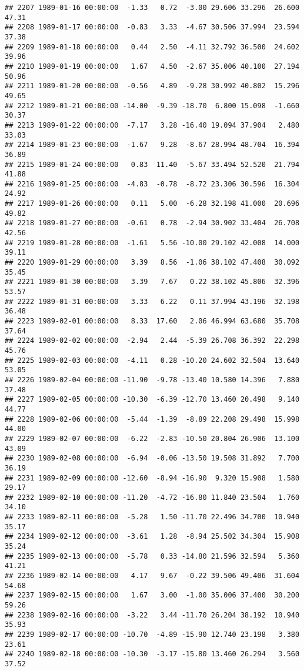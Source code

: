 \documentclass{article}\usepackage{graphicx, color}
\makeatletter
\newenvironment{kframe}{%
 \def\at@end@of@kframe{}%
 \ifinner\ifhmode%
  \def\at@end@of@kframe{\end{minipage}}%
  \begin{minipage}{\columnwidth}%
 \fi\fi%
 \def\FrameCommand##1{\hskip\@totalleftmargin \hskip-\fboxsep
 \colorbox{shadecolor}{##1}\hskip-\fboxsep
     \hskip-\linewidth \hskip-\@totalleftmargin \hskip\columnwidth}%
 \MakeFramed {\advance\hsize-\width
   \@totalleftmargin\z@ \linewidth\hsize
   \@setminipage}}%
 {\par\unskip\endMakeFramed%
 \at@end@of@kframe}
\newenvironment{knitrout}{}{} %
\makeatother
\begin{document}
\begin{knitrout}
\begin{kframe}
\begin{verbatim}
## 2207 1989-01-16 00:00:00  -1.33   0.72  -3.00 29.606 33.296  26.600  47.31
## 2208 1989-01-17 00:00:00  -0.83   3.33  -4.67 30.506 37.994  23.594  37.38
## 2209 1989-01-18 00:00:00   0.44   2.50  -4.11 32.792 36.500  24.602  39.96
## 2210 1989-01-19 00:00:00   1.67   4.50  -2.67 35.006 40.100  27.194  50.96
## 2211 1989-01-20 00:00:00  -0.56   4.89  -9.28 30.992 40.802  15.296  49.65
## 2212 1989-01-21 00:00:00 -14.00  -9.39 -18.70  6.800 15.098  -1.660  30.37
## 2213 1989-01-22 00:00:00  -7.17   3.28 -16.40 19.094 37.904   2.480  33.03
## 2214 1989-01-23 00:00:00  -1.67   9.28  -8.67 28.994 48.704  16.394  36.89
## 2215 1989-01-24 00:00:00   0.83  11.40  -5.67 33.494 52.520  21.794  41.88
## 2216 1989-01-25 00:00:00  -4.83  -0.78  -8.72 23.306 30.596  16.304  24.92
## 2217 1989-01-26 00:00:00   0.11   5.00  -6.28 32.198 41.000  20.696  49.82
## 2218 1989-01-27 00:00:00  -0.61   0.78  -2.94 30.902 33.404  26.708  42.56
## 2219 1989-01-28 00:00:00  -1.61   5.56 -10.00 29.102 42.008  14.000  39.11
## 2220 1989-01-29 00:00:00   3.39   8.56  -1.06 38.102 47.408  30.092  35.45
## 2221 1989-01-30 00:00:00   3.39   7.67   0.22 38.102 45.806  32.396  53.57
## 2222 1989-01-31 00:00:00   3.33   6.22   0.11 37.994 43.196  32.198  36.48
## 2223 1989-02-01 00:00:00   8.33  17.60   2.06 46.994 63.680  35.708  37.64
## 2224 1989-02-02 00:00:00  -2.94   2.44  -5.39 26.708 36.392  22.298  45.76
## 2225 1989-02-03 00:00:00  -4.11   0.28 -10.20 24.602 32.504  13.640  53.05
## 2226 1989-02-04 00:00:00 -11.90  -9.78 -13.40 10.580 14.396   7.880  37.48
## 2227 1989-02-05 00:00:00 -10.30  -6.39 -12.70 13.460 20.498   9.140  44.77
## 2228 1989-02-06 00:00:00  -5.44  -1.39  -8.89 22.208 29.498  15.998  44.00
## 2229 1989-02-07 00:00:00  -6.22  -2.83 -10.50 20.804 26.906  13.100  43.09
## 2230 1989-02-08 00:00:00  -6.94  -0.06 -13.50 19.508 31.892   7.700  36.19
## 2231 1989-02-09 00:00:00 -12.60  -8.94 -16.90  9.320 15.908   1.580  29.17
## 2232 1989-02-10 00:00:00 -11.20  -4.72 -16.80 11.840 23.504   1.760  34.10
## 2233 1989-02-11 00:00:00  -5.28   1.50 -11.70 22.496 34.700  10.940  35.17
## 2234 1989-02-12 00:00:00  -3.61   1.28  -8.94 25.502 34.304  15.908  35.24
## 2235 1989-02-13 00:00:00  -5.78   0.33 -14.80 21.596 32.594   5.360  41.21
## 2236 1989-02-14 00:00:00   4.17   9.67  -0.22 39.506 49.406  31.604  54.68
## 2237 1989-02-15 00:00:00   1.67   3.00  -1.00 35.006 37.400  30.200  59.26
## 2238 1989-02-16 00:00:00  -3.22   3.44 -11.70 26.204 38.192  10.940  35.93
## 2239 1989-02-17 00:00:00 -10.70  -4.89 -15.90 12.740 23.198   3.380  23.61
## 2240 1989-02-18 00:00:00 -10.30  -3.17 -15.80 13.460 26.294   3.560  37.52

\end{verbatim}
\end{kframe}
\end{knitrout}
\end{document}
